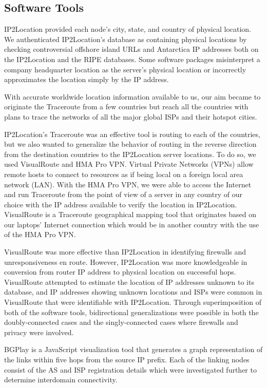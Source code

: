 \documentclass{sigcomm-alternate}
\begin{document}
\subsection{Software Tools}
IP2Location provided each node’s city, state, and country of physical location. We authenticated IP2Location's database as containing physical locations by checking controversial offshore island URLs and Antarctica IP addresses both on the IP2Location and the RIPE databases. Some software packages misinterpret a company headquarter location as the server's physical location or incorrectly approximates the location simply by the IP address.  

With accurate worldwide location information available to us, our aim became to originate the Traceroute from a few countries but reach all the countries with plans to trace the networks of all the major global ISPs and their hotspot cities.

IP2Location's Traceroute was an effective tool is routing to each of the countries, but we also wanted to generalize the behavior of routing in the reverse direction from the destination countries to the IP2Location server locations. To do so, we used VisualRoute and HMA Pro VPN. Virtual Private Networks (VPNs) allow remote hosts to connect to resources as if being local on a foreign local area network (LAN). With the HMA Pro VPN, we were able to access the Internet and run Traceroute from the point of view of a server in any country of our choice with the IP address available to verify the location in IP2Location. VisualRoute is a Traceroute geographical mapping tool that originates based on our laptops' Internet connection which would be in another country with the use of the HMA Pro VPN.

VisualRoute was more effective than IP2Location in identifying firewalls and unresponsiveness en route. However, IP2Location was more knowledgeable in conversion from router IP address to physical location on successful hops. VisualRoute attempted to estimate the location of IP addresses unknown to its database, and IP addresses showing unknown locations and ISPs were common in VisualRoute that were identifiable with IP2Location. Through superimposition of both of the software tools, bidirectional generalizations were possible in both the doubly-connected cases and the singly-connected cases where firewalls and privacy were involved.

BGPlay is a JavaScript visualization tool that generates a graph representation of the links within five hops from the source IP prefix. Each of the linking nodes consist of the AS and ISP registration details which were investigated further to determine interdomain connectivity.
\end{document}
